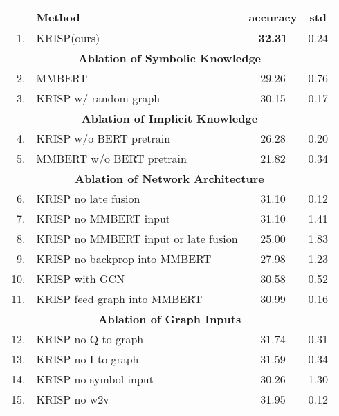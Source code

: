\documentclass[final]{cvpr}
\providecommand{\ModelName}{KRISP\xspace}
\providecommand{\MMBERTAbr}{MMBERT\xspace}
\begin{document}
\begin{table*}[h]
\begin{center}
\begin{tabular}{@{}rlcc@{}}
\toprule
&Method & accuracy & std\\ \midrule
1. & \ModelName (ours) & \bf{32.31}  & 0.24 \\
\hline
\multicolumn{4}{c}{\textbf{Ablation of Symbolic Knowledge}}\\
2. & \MMBERTAbr & 29.26  & 0.76 \\
3. & \ModelName w/ random graph & 30.15  & 0.17  \\
\hline
\multicolumn{4}{c}{\textbf{Ablation of Implicit Knowledge}}\\
4. & \ModelName  w/o BERT pretrain & 26.28  & 0.20  \\
5. & \MMBERTAbr w/o BERT pretrain & 21.82  & 0.34  \\
\hline
\multicolumn{4}{c}{\textbf{Ablation of Network Architecture}}\\
6. & \ModelName no late fusion & 31.10 & 0.12  \\
7. & \ModelName no \MMBERTAbr input & 31.10 & 1.41  \\
8. & \ModelName no \MMBERTAbr input or late fusion & 25.00 & 1.83 \\
9. & \ModelName no backprop into \MMBERTAbr & 27.98 & 1.23 \\
10. & \ModelName with GCN & 30.58 & 0.52  \\
11. & \ModelName feed graph into \MMBERTAbr & 30.99 & 0.16  \\
\hline
\multicolumn{4}{c}{\textbf{Ablation of Graph Inputs}}\\
12. & \ModelName no Q to graph & 31.74 & 0.31 \\
13. & \ModelName no I to graph & 31.59 & 0.34 \\
14. & \ModelName no symbol input & 30.26 & 1.30 \\
15. & \ModelName no w2v & 31.95 & 0.12 \\
\bottomrule
\end{tabular}
\end{center}
\caption{\ModelName ablation on OK-VQA v1.1, with sample standard deviations. Mirrors Table~\ref{table:AllAblation} in the main text.}
\label{table:AllAblationStd}
\end{table*}
\end{document}

